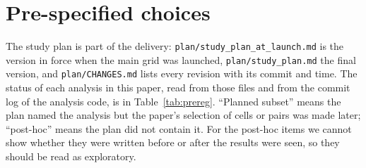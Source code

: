 \begin{table}[h]
\centering\small
\resizebox{\linewidth}{!}{}
\caption{German Credit reference check, per model: relative $\ell_2$ distance of the 20\,000-coalition reference (mean of 10 Kernel runs) to the exact vector by enumeration of $2^{20}$ coalitions (median and maximum over the instances checked), the reference's median relative standard error, and the number of instances whose top-3 and top-5 sets coincide.}
\label{tab:refcheck}
\end{table}
\begin{table}[h]
\centering\small
\resizebox{\linewidth}{!}{}
\caption{Explained output: probability of the positive class versus log-odds. Fraction of instances whose exact (reference) top-3 sets coincide, with 95\% CI, and the top-3 match probability to each output's own reference at the smallest and largest budget. For German logistic regression the log-odds game is linear, so Kernel SHAP is exact there. Only these five cells were run (ACS Employment gbm; German gbm, lr, mlp; Pima gbm).}
\label{tab:logit}
\end{table}

\section{Pre-specified choices}
\label{app:prereg}
The study plan is part of the delivery: \texttt{plan/study\_plan\_at\_launch.md} is the version in force when the main grid was launched, \texttt{plan/study\_plan.md} the final version, and \texttt{plan/CHANGES.md} lists every revision with its commit and time. The status of each analysis in this paper, read from those files and from the commit log of the analysis code, is in Table~\ref{tab:prereg}. ``Planned subset'' means the plan named the analysis but the paper's selection of cells or pairs was made later; ``post-hoc'' means the plan did not contain it. For the post-hoc items we cannot show whether they were written before or after the results were seen, so they should be read as exploratory.

